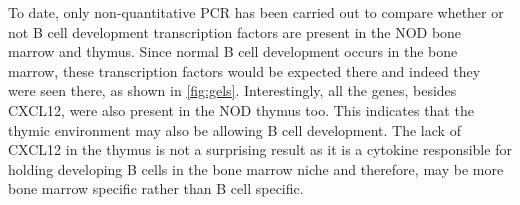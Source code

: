 To date, only non-quantitative PCR has been carried out to compare whether or not B cell development transcription factors are present in the NOD bone marrow and thymus.
Since normal B cell development occurs in the bone marrow, these transcription factors would be expected there and indeed they were seen there, as shown in \cref{fig:gels}. 
Interestingly, all the genes, besides CXCL12, were also present in the NOD thymus too.
This indicates that the thymic environment may also be allowing B cell development.
The lack of CXCL12 in the thymus is not a surprising result as it is a cytokine responsible for holding developing B cells in the bone marrow niche and therefore, may be more bone marrow specific rather than B cell specific.


